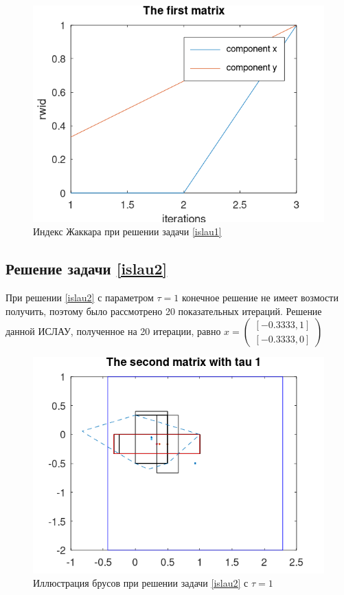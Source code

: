 \documentclass[12pt,a4paper]{article}
\begin{document}
\begin{figure}[H]
    \centering
    \includegraphics[scale=0.6]{Images/rwid1.png}
    \caption{Индекс Жаккара при решении задачи \eqref{islau1}}
\end{figure}

\subsection{Решение задачи \eqref{islau2}}
При решении \eqref{islau2} с параметром $\tau=1$ конечное решение не имеет возмости получить, поэтому было рассмотрено 20 показательных итераций.
Решение данной ИСЛАУ, полученное на 20 итерации, равно $x=
\begin{pmatrix}
    [-0.3333,1]\\
    [-0.3333,0]
\end{pmatrix}$

\begin{figure}[H]
    \centering
    \includegraphics[scale=0.6]{Images/matrix2.png}
    \caption{Иллюстрация брусов при решении задачи \eqref{islau2} с $\tau=1$}
\end{figure}
\end{document}
